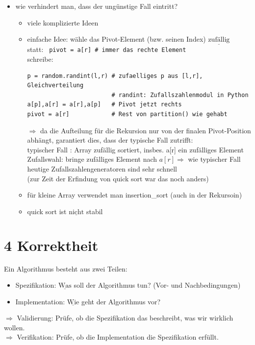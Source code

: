 \documentclass[11pt, fleqn]{scrreprt}
\begin{document}
\begin{itemize}
    \item wie verhindert man, dass der ungünstige Fall eintritt?
    \begin{itemize}
        \item viele komplizierte Ideen
        \item einfache Idee: wähle das Pivot-Element (bzw. seinen Index) $\underline{\text{zufällig}}$ \\
        statt: \verb| pivot = a[r] # immer das rechte Element | \\
        schreibe:
        \begin{verbatim}
p = random.randint(l,r) # zufaelliges p aus [l,r], Gleichverteilung
                        # randint: Zufallszahlenmodul in Python
a[p],a[r] = a[r],a[p]   # Pivot jetzt rechts
pivot = a[r]            # Rest von partition() wie gehabt
        \end{verbatim}
        $\Rightarrow$ da die Aufteilung für die Rekursion nur von der finalen Pivot-Position abhängt, garantiert dies, dass der typische Fall zutrifft: \\
        typischer Fall : Array zufällig sortiert, insbes. a[r] ein zufälliges Element \\
        Zufallswahl: bringe zufälliges Element nach $a[r] \Rightarrow$ wie typischer Fall \\
        heutige Zufallszahlengeneratoren sind sehr schnell \\
        (zur Zeit der Erfindung von quick sort war das noch anders)
        \item für kleine Array verwendet man insertion\_sort (auch in der Rekursoin)
        \item quick sort ist $\underline{\text{nicht}}$ stabil
    \end{itemize}
\end{itemize}

\chapter*{4 Korrektheit}

Ein Algorithmus besteht aus zwei Teilen:
\begin{itemize}
    \item Spezifikation: $\underline{\text{Was}}$ soll der Algorithmus tun? (Vor- und Nachbedingungen)
    \item Implementation: $\underline{\text{Wie}}$ geht der Algorithmus vor?
\end{itemize}
$\Rightarrow$ Validierung: Prüfe, ob die Spezifikation das beschreibt, was wir wirklich wollen. \\
$\Rightarrow$ Verifikation: Prüfe, ob die Implementation die Spezifikation erfüllt. \\
\end{document}
